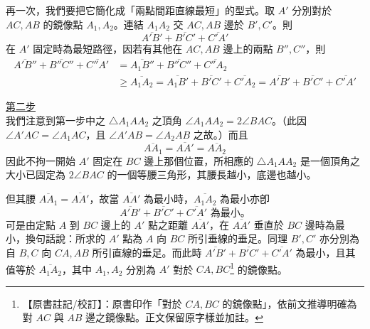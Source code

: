 再一次，我們要把它簡化成「兩點間距直線最短」的型式。取 $A'$ 分別對於 $AC, AB$ 的鏡像點 $A_1, A_2$。連結 $A_1A_2$ 交 $AC, AB$ 邊於 $B', C'$。則
\[ \overline{A'B'} + \overline{B'C'} + \overline{C'A'} \]
在 $A'$ 固定時為最短路徑，因若有其他在 $AC, AB$ 邊上的兩點 $B'', C''$，則
\begin{align*}
\overline{A'B''} + \overline{B''C''} + \overline{C''A'} &= \overline{A_1B''} + \overline{B''C''} + \overline{C''A_2} \\
&\ge \overline{A_1A_2} = \overline{A_1B'} + \overline{B'C'} + \overline{C'A_2} = \overline{A'B'} + \overline{B'C'} + \overline{C'A'}
\end{align*}

\noindent\underline{第二步} \\
我們注意到第一步中之 $\triangle A_1AA_2$ 之頂角 $\angle A_1AA_2 = 2\angle BAC$。（此因 $\angle A'AC = \angle A_1AC$，且 $\angle A'AB = \angle A_2AB$ 之故。）而且
\[ \overline{AA_1} = \overline{AA'} = \overline{AA_2} \]
因此不拘一開始 $A'$ 固定在 $BC$ 邊上那個位置，所相應的 $\triangle A_1AA_2$ 是一個頂角之大小已固定為 $2\angle BAC$ 的一個等腰三角形，其腰長越小，底邊也越小。

但其腰 $\overline{AA_1} = \overline{AA'}$，故當 $\overline{AA'}$ 為最小時，$\overline{A_1A_2}$ 為最小亦卽
\[ \overline{A'B'} + \overline{B'C'} + \overline{C'A'} \text{ 為最小。} \]
可是由定點 $A$ 到 $BC$ 邊上的 $A'$ 點之距離 $\overline{AA'}$，在 $\overline{AA'}$ 垂直於 $BC$ 邊時為最小，換句話說：所求的 $A'$ 點為 $A$ 向 $BC$ 所引垂線的垂足。同理 $B', C'$ 亦分別為自 $B, C$ 向 $CA, AB$ 所引直線的垂足。而此時 $\overline{A'B'} + \overline{B'C'} + \overline{C'A'}$ 為最小，且其值等於 $\overline{A_1A_2}$，其中 $A_1, A_2$ 分別為 $A'$ 對於 $CA, BC$\label{note:b3-ch5-p255-mirror-line}\footnote{【原書註記/校訂】：原書印作「對於 $CA, BC$ 的鏡像點」，依前文推導明確為對 $AC$ 與 $AB$ 邊之鏡像點。正文保留原字樣並加註。} 的鏡像點。

